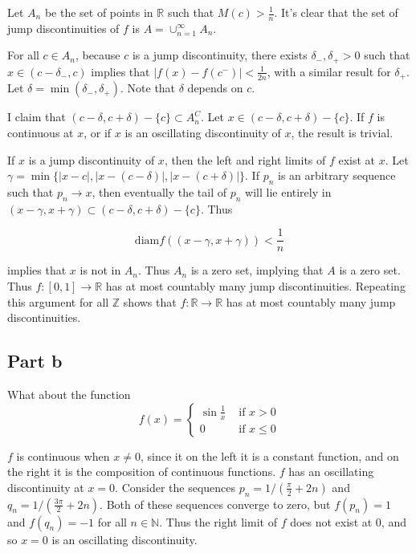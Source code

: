 \documentclass{article}
\newcommand{\R}{\mathbb{R}}
\newcommand{\Z}{\mathbb{Z}}
\newcommand{\N}{\mathbb{N}}
\newcommand{\diam}{\text{diam}}
\begin{document}
Let $A_n$ be the set of points in $\R$ such that $M(c) > \frac{1}{n}$. It's clear that the set of jump discontinuities of $f$ is $A = \cup_{n=1}^\infty A_n$.

For all $c \in A_n$, because $c$ is a jump discontinuity, there exists $\delta_-, \delta_+ > 0$ such that $x \in (c-\delta_-, c)$ implies that $|f(x) - f(c^-)| < \frac{1}{2n}$, with a similar result for $\delta_+$. Let $\delta = \min (\delta_-, \delta_+)$. Note that $\delta$ depends on $c$.

I claim that $(c - \delta, c + \delta) - \{c\} \subset A_n^C$. Let $x \in (c - \delta, c + \delta) - \{c\}$. If $f$ is continuous at $x$, or if $x$ is an oscillating discontinuity of $x$, the result is trivial.

If $x$ is a jump discontinuity of $x$, then the left and right limits of $f$ exist at $x$. Let $\gamma = \min\{|x-c|, |x - (c-\delta)|, |x-(c+\delta)| \}$. If $p_n$ is an arbitrary sequence such that $p_n \rightarrow x$, then eventually the tail of $p_n$ will lie entirely in $(x-\gamma, x+\gamma) \subset (c - \delta, c + \delta) - \{c\}$. Thus

\[
\diam f((x - \gamma, x + \gamma)) < \frac{1}{n}
\]

implies that $x$ is not in $A_n$. Thus $A_n$ is a zero set, implying that $A$ is a zero set. Thus $f:[0, 1] \rightarrow \R$ has at most countably many jump discontinuities. Repeating this argument for all $\Z$ shows that $f:\R \rightarrow \R$ has at most countably many jump discontinuities.

\subsection*{Part b}

What about the function
\[
f(x) = 
\begin{cases}
\sin \frac{1}{x} & \text{ if } x > 0 \\
0 & \text{ if } x \leq 0
\end{cases}
\]

$f$ is continuous when $x \neq 0$, since it on the left it is a constant function, and on the right it is the composition of continuous functions. $f$ has an oscillating discontinuity at $x=0$. Consider the sequences $p_n = 1/ (\frac{\pi}{2} + 2n)$ and $q_n = 1/ (\frac{3\pi}{2} + 2n)$. Both of these sequences converge to zero, but $f(p_n) = 1$ and $f(q_n) = -1$ for all $n \in \N$. Thus the right limit of $f$ does not exist at $0$, and so $x=0$ is an oscillating discontinuity.
\end{document}
